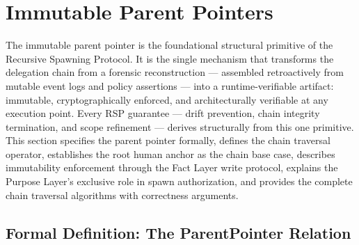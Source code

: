 \section{Immutable Parent Pointers}
\label{sec:immutable-parent-pointers}

The immutable parent pointer is the foundational structural primitive of the Recursive Spawning Protocol. It is the single mechanism that transforms the delegation chain from a forensic reconstruction — assembled retroactively from mutable event logs and policy assertions — into a runtime-verifiable artifact: immutable, cryptographically enforced, and architecturally verifiable at any execution point. Every RSP guarantee — drift prevention, chain integrity termination, and scope refinement — derives structurally from this one primitive. This section specifies the parent pointer formally, defines the chain traversal operator, establishes the root human anchor as the chain base case, describes immutability enforcement through the Fact Layer write protocol, explains the Purpose Layer's exclusive role in spawn authorization, and provides the complete chain traversal algorithms with correctness arguments.

\subsection{Formal Definition: The ParentPointer Relation}
\label{sec:parent-pointer-formal}

